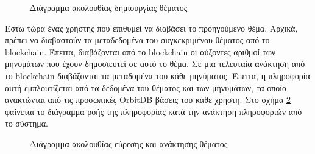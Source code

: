 \vspace{\baselineskip}

\begin{figure}[H]
    \centering
    
    \caption{Διάγραμμα ακολουθίας δημιουργίας θέματος}
    \label{figure:4-3-data-flow-insert}
\end{figure}

\newpage
Έστω τώρα ένας χρήστης που επιθυμεί να διαβάσει το προηγούμενο θέμα. Αρχικά, πρέπει να διαβαστούν τα μεταδεδομένα του συγκεκριμένου θέματος από το blockchain. Έπειτα, διαβάζονται από το blockchain οι αύξοντες αριθμοί των μηνυμάτων που έχουν δημοσιευτεί σε αυτό το θέμα. Σε μία τελευταία ανάκτηση από το blockchain διαβάζονται τα μεταδομένα του κάθε μηνύματος. Έπειτα, η πληροφορία αυτή εμπλουτίζεται από τα δεδομένα του θέματος και των μηνυμάτων, τα οποία ανακτώνται από τις προσωπικές OrbitDB βάσεις του κάθε χρήστη. Στο σχήμα \ref{figure:4-3-data-flow-read} φαίνεται το διάγραμμα ροής της πληροφορίας κατά την ανάκτηση πληροφοριών από το σύστημα.

\vspace{\baselineskip}

\begin{figure}[H]
    \centering
    
    \caption{Διάγραμμα ακολουθίας εύρεσης και ανάκτησης θέματος}
    \label{figure:4-3-data-flow-read}
\end{figure}
